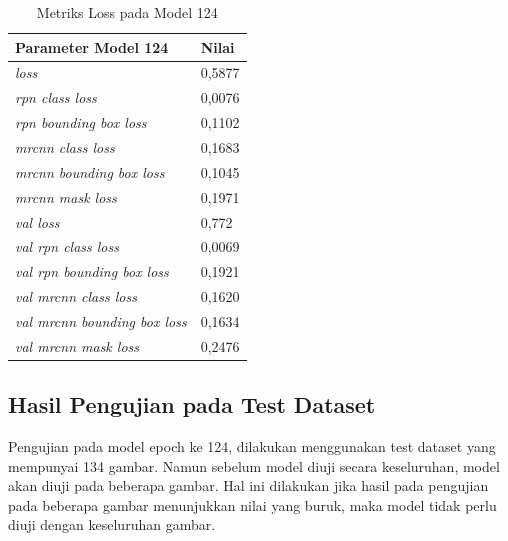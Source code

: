 \begin{table}
  \caption{Metriks Loss pada Model 124}
  \label{tab:MaskRCCN_Loss}
  \centering
  \begin{tabular}{ | l | l | }
    \hline
    \textbf{Parameter Model 124} & \textbf{Nilai} \\ \hline
    \textit{loss}             & 0,5877                   \\ \hline
    \textit{rpn class loss}    & 0,0076               \\ \hline
    \textit{rpn bounding box loss}             & 0,1102                  \\ \hline
    \textit{mrcnn class loss}             & 0,1683                   \\ \hline
    \textit{mrcnn bounding box loss}    & 0,1045                \\ \hline
    \textit{mrcnn mask loss}             & 0,1971                   \\ \hline

    \textit{val loss}             & 0,772                   \\ \hline
    \textit{val rpn class loss}    & 0,0069               \\ \hline
    \textit{val rpn bounding box loss}             & 0,1921                  \\ \hline
    \textit{val mrcnn class loss}             & 0,1620                   \\ \hline
    \textit{val mrcnn bounding box loss}    & 0,1634                \\ \hline
    \textit{val mrcnn mask loss}             & 0,2476                  \\ \hline
  \end{tabular}
\end{table}

\subsection{Hasil Pengujian pada Test Dataset}
Pengujian pada model epoch ke 124, dilakukan menggunakan test dataset yang mempunyai 134 gambar. Namun
sebelum model diuji secara keseluruhan, model akan diuji pada beberapa gambar. Hal ini dilakukan jika
hasil pada pengujian pada beberapa gambar menunjukkan nilai yang buruk, maka model tidak perlu diuji
dengan keseluruhan gambar.

